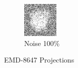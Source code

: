\documentclass{report}
\begin{document}
\begin{figure}[H]
\begin{subfigure}{.28\textwidth}
\includegraphics[width=0.8\linewidth]{Emd_8647_proj1_noise_100.jpg}
\captionsetup{justification=centering}
\caption{ Noise 100\%}
\end{subfigure}
\caption{EMD-8647 Projections}
\label{fig:EMD-8647 Projections: Noisy}
\end{figure}
\end{document}
